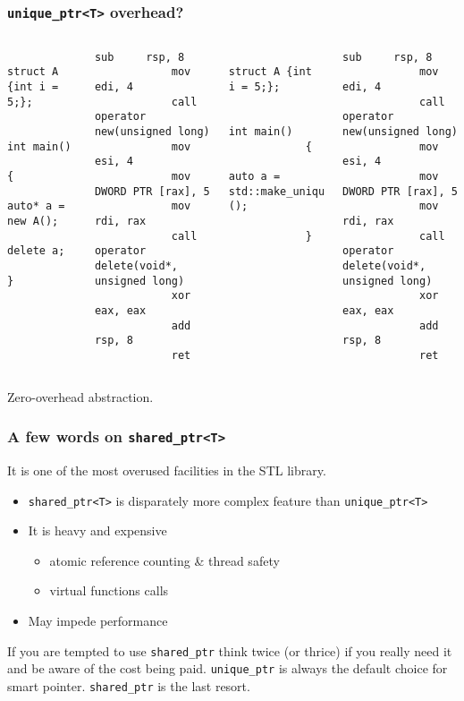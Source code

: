 \documentclass{beamer}
\begin{document}
\begin{frame}[fragile,t]
\frametitle{\texttt{unique\_ptr<T>} overhead?}
	\begin{columns}[t]
		\begin{lstlisting}
			struct A {int i = 5;};
			
			int main()
			{
				auto* a = new A();
				delete a;
			}
		\end{lstlisting}
		
		\begin{lstlisting}[backgroundcolor=\color{black}, basicstyle=\color{white}\tiny]
			sub     rsp, 8
			mov     edi, 4
			call    operator new(unsigned long)
			mov     esi, 4
			mov     DWORD PTR [rax], 5
			mov     rdi, rax
			call    operator delete(void*, unsigned long)
			xor     eax, eax
			add     rsp, 8
			ret
		\end{lstlisting}
	\pause
		\begin{lstlisting}
			struct A {int i = 5;};		
		
			int main()
			{
				auto a = std::make_unique<A>();
				
			}			
        \end{lstlisting}
        
        \begin{lstlisting}[backgroundcolor=\color{black}, basicstyle=\color{white}\tiny]
			sub     rsp, 8
			mov     edi, 4
			call    operator new(unsigned long)
			mov     esi, 4
			mov     DWORD PTR [rax], 5
			mov     rdi, rax
			call    operator delete(void*, unsigned long)
			xor     eax, eax
			add     rsp, 8
			ret
        \end{lstlisting}
	\end{columns}
	\pause
	\begin{center}Zero-overhead abstraction.\end{center}
\end{frame}

\begin{frame}
\frametitle{A few words on \texttt{shared\_ptr<T>}}
	It is one of the most overused facilities in the STL library. \newline
	\begin{itemize}
		\item \texttt{shared\_ptr<T>} is disparately more complex feature than
			  \texttt{unique\_ptr<T>}
		\item It is heavy and expensive
		\begin{itemize}
			\item atomic reference counting \& thread safety
			\item virtual functions calls
		\end{itemize}
		\item May impede performance
		
	\end{itemize}
	If you are tempted to use \texttt{shared\_ptr} think twice (or thrice) if you really
			  need it and be aware of the cost being paid. \newline
	\texttt{unique\_ptr} is always the default choice for smart pointer. \texttt{shared\_ptr} is the last resort.
\end{frame}
\end{document}
